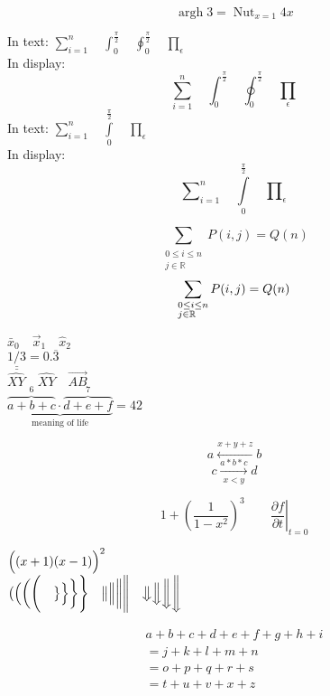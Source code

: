 \documentclass{article}
\DeclareMathOperator{\argh}{argh}
\DeclareMathOperator*{\nut}{Nut}
\begin{document}
	\[\argh 3 = \nut_{x=1} 4x\]%

	In text:
	$\sum_{i=1}^n \quad
	\int_0^{\frac{\pi}{2}} \quad
	\oint_0^{\frac{\pi}{2}} \quad
	\prod_\epsilon $ \\
	In display:
	\[\sum_{i=1}^n \quad
	\int_0^{\frac{\pi}{2}} \quad
	\oint_0^{\frac{\pi}{2}} \quad
	\prod_\epsilon \]
	In text:
	$\sum\limits_{i=1}^n \quad
	\int\limits_0^{\frac{\pi}{2}} \quad
	\prod\limits_\epsilon $ \\
	In display:
	\[\sum\nolimits_{i=1}^n \quad
	\int\limits_0^{\frac{\pi}{2}} \quad
	\prod\nolimits_\epsilon \]

	\[
	\sum_{\substack{0\le i\le n \\
	j\in \mathbb{R}}}
	P(i,j) = Q(n)
	\]
	\[
	\sum_{\begin{subarray}{l}
	0\le i\le n \\
	j\in \mathbb{R}
	\end{subarray}}
	P(i,j) = Q(n)
	\]

	$\bar{x}_0 \quad \vec{x}_1 \quad \hat{x}_2$\\
	$\underline{\underline{1/3}} = 0.\overline{3}$\\
	$\hat{XY} \quad \widehat{XY} \quad \overrightarrow{AB}$\\
	$\underbrace{\overbrace{a+b+c}^6 \cdot \overbrace{d+e+f}^7}_\text{meaning of life} =42$

	\[ a\xleftarrow{x+y+z} b \]
	\[ c\xrightarrow[x<y]{a*b*c}d \]


	\[1 + \left(\frac{1}{1-x^{2}}
	\right)^3 \qquad
	\left.\frac{\partial f}{\partial t}
	\right|_{t=0}\]

	$\Bigl((x+1)(x-1)\Bigr)^{2}$\\
	$\bigl( \Bigl( \biggl( \Biggl( \quad
	\bigr\} \Bigr\} \biggr\} \Biggr\} \quad
	\big\| \Big\| \bigg\| \Bigg\| \quad
	\big\Downarrow \Big\Downarrow
	\bigg\Downarrow \Bigg\Downarrow$


	\begin{multline}
	a + b + c + d + e + f
	+ g + h + i \\
	= j + k + l + m + n\\
	= o + p + q + r + s\\
	= t + u + v + x + z
	\end{multline}
\end{document}
